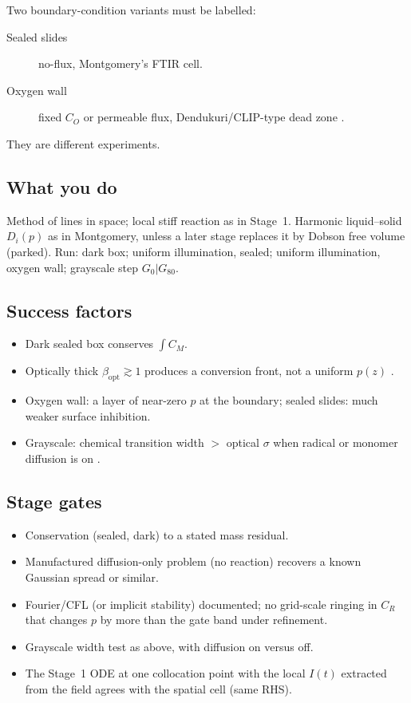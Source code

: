 \documentclass[11pt,a4paper]{article}
\begin{document}
Two boundary-condition variants must be labelled:
\begin{description}
  \item[Sealed slides] no-flux, Montgomery's FTIR cell.
  \item[Oxygen wall] fixed $C_O$ or permeable flux, Dendukuri/CLIP-type dead zone \citep{Dendukuri2008,Tumbleston2015}.
\end{description}
They are different experiments.

\subsection{What you do}
Method of lines in space; local stiff reaction as in Stage~1.
Harmonic liquid--solid $D_i(p)$ as in Montgomery, unless a later stage replaces it by Dobson free volume (parked).
Run: dark box; uniform illumination, sealed; uniform illumination, oxygen wall; grayscale step $G_0|G_{80}$.

\subsection{Success factors}
\begin{itemize}
  \item Dark sealed box conserves $\int C_M$.
  \item Optically thick $\beta_{\mathrm{opt}}\gtrsim 1$ produces a conversion front, not a uniform $p(z)$ \citep{Cabral2005,Zhu2020,Montgomery2022}.
  \item Oxygen wall: a layer of near-zero $p$ at the boundary; sealed slides: much weaker surface inhibition.
  \item Grayscale: chemical transition width $>$ optical $\sigma$ when radical or monomer diffusion is on \citep{Montgomery2022}.
\end{itemize}

\subsection{Stage gates}
\begin{itemize}
  \item Conservation (sealed, dark) to a stated mass residual.
  \item Manufactured diffusion-only problem (no reaction) recovers a known Gaussian spread or similar.
  \item Fourier/CFL (or implicit stability) documented; no grid-scale ringing in $C_R$ that changes $p$ by more than the gate band under refinement.
  \item Grayscale width test as above, with diffusion on versus off.
  \item The Stage~1 ODE at one collocation point with the local $I(t)$ extracted from the field agrees with the spatial cell (same RHS).
\end{itemize}
\end{document}
